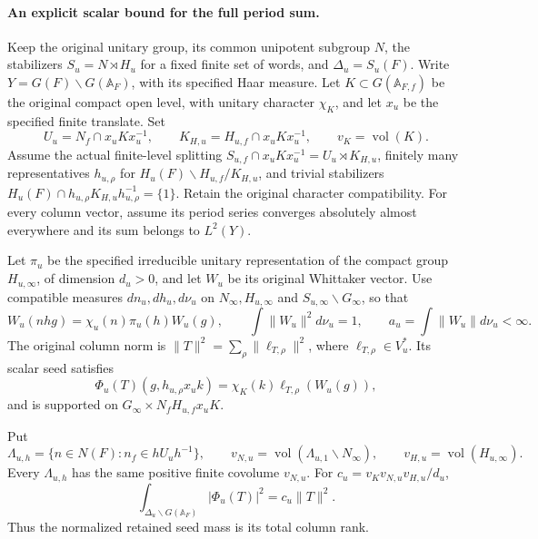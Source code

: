 \paragraph{An explicit scalar bound for the full period sum.}
Keep the original unitary group, its common unipotent subgroup \(N\),
the stabilizers \(S_u=N\rtimes H_u\) for a fixed finite set of words, and
\(\Delta_u=S_u(F)\). Write
\(Y=G(F)\backslash G(\mathbb A_F)\), with its specified Haar measure.
Let \(K\subset G(\mathbb A_{F,f})\) be the original compact open
level, with unitary character \(\chi_K\), and let \(x_u\) be the
specified finite translate. Set
\[
 U_u=N_f\cap x_uKx_u^{-1},\qquad
 K_{H,u}=H_{u,f}\cap x_uKx_u^{-1},\qquad v_K=\operatorname{vol}(K).
\]
Assume the actual finite-level splitting
\(S_{u,f}\cap x_uKx_u^{-1}=U_u\rtimes K_{H,u}\), finitely many
representatives \(h_{u,\rho}\) for
\(H_u(F)\backslash H_{u,f}/K_{H,u}\), and trivial stabilizers
\(H_u(F)\cap h_{u,\rho}K_{H,u}h_{u,\rho}^{-1}=\{1\}\).
Retain the original character compatibility. For every column vector,
assume its period series converges absolutely almost everywhere and
its sum belongs to \(L^2(Y)\).

Let \(\pi_u\) be the specified irreducible unitary representation of
the compact group \(H_{u,\infty}\), of dimension \(d_u>0\), and let
\(W_u\) be its original Whittaker vector. Use compatible measures
\(dn_u,dh_u,d\nu_u\) on \(N_\infty,H_{u,\infty}\) and
\(S_{u,\infty}\backslash G_\infty\), so that
\[
 W_u(nhg)=\chi_u(n)\pi_u(h)W_u(g),\qquad
 \int\|W_u\|^2d\nu_u=1,\qquad
 a_u=\int\|W_u\|d\nu_u<\infty.
\]
The original column norm is
\(\|T\|^2=\sum_\rho\|\ell_{T,\rho}\|^2\), where
\(\ell_{T,\rho}\in V_u^*\). Its scalar seed satisfies
\[
 \Phi_u(T)(g,h_{u,\rho}x_uk)
   =\chi_K(k)\ell_{T,\rho}(W_u(g)),
\]
and is supported on \(G_\infty\times N_fH_{u,f}x_uK\).

\begin{lemma}
\label{shared-exact-seed-normalization}
Put
\[
 \Lambda_{u,h}=\{n\in N(F):n_f\in hU_uh^{-1}\},\qquad
 v_{N,u}=\operatorname{vol}(\Lambda_{u,1}\backslash N_\infty),
 \qquad v_{H,u}=\operatorname{vol}(H_{u,\infty}).
\]
Every \(\Lambda_{u,h}\) has the same positive finite covolume
\(v_{N,u}\). For \(c_u=v_Kv_{N,u}v_{H,u}/d_u\),
\[
 \int_{\Delta_u\backslash G(\mathbb A_F)}|\Phi_u(T)|^2
       =c_u\|T\|^2.
\]
Thus the normalized retained seed mass is its total column rank.
\end{lemma}

